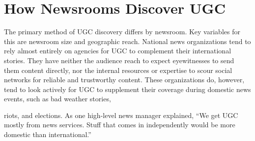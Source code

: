 \documentclass[symmetric, notoc, nobib]{towcenter-book}
\begin{document}
\section{How Newsrooms Discover UGC}
The primary method of UGC discovery differs by newsroom. Key variables
for this are newsroom size and geographic reach. National news organizations
tend to rely almost entirely on agencies for UGC to complement their
international stories. They have neither the audience reach to expect eyewitnesses
to send them content directly, nor the internal resources or expertise
to scour social networks for reliable and trustworthy content. These
organizations do, however, tend to look actively for UGC to supplement
their coverage during domestic news events, such as bad weather stories,

riots, and elections. As one high-level news manager explained, ``We get
UGC mostly from news services. Stuff that comes in independently would
be more domestic than international.''
\end{document}
